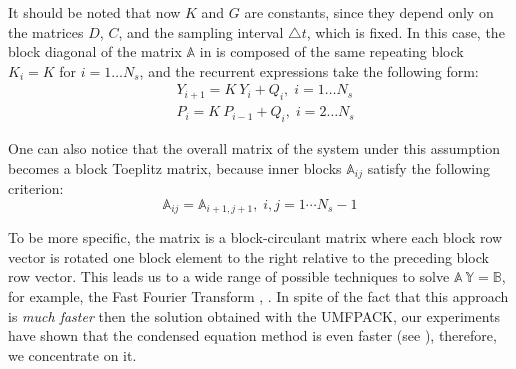 It should be noted that now $K$ and $G$ are constants, since they depend only on the matrices $D$, $C$, and the sampling interval $\triangle t$, which is fixed. In this case, the block diagonal of the matrix $\mathbb{A}$ in  is composed of the same repeating block $K_i = K$ for $i = 1 \dots N_s$, and the recurrent expressions take the following form:
\begin{align}
  & Y_{i + 1} = K \: Y_i + Q_i, \; i = 1 \dots N_s \nonumber \\
  & P_i = K \: P_{i - 1} + Q_i, \; i = 2 \dots N_s \nonumber
\end{align}

One can also notice that the overall matrix of the system under this assumption becomes a block Toeplitz matrix, because inner blocks $\mathbb{A}_{ij}$ satisfy the following criterion:
\[
  \mathbb{A}_{ij} = \mathbb{A}_{i+1, j+1}, \; i, j = 1 \cdots N_s - 1
\]

To be more specific, the matrix is a block-circulant matrix where each block row vector is rotated one block element to the right relative to the preceding block row vector. This leads us to a wide range of possible techniques to solve \mbox{$\mathbb{A} \: \mathbb{Y} = \mathbb{B}$}, for example, the Fast Fourier Transform \cite{mazancourt1983}, \cite{vescovo1997}. In spite of the fact that this approach is \emph{much faster} then the solution obtained with the UMFPACK, our experiments have shown that the condensed equation method is even faster (see ), therefore, we concentrate on it.
